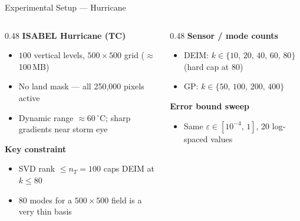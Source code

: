 \documentclass[aspectratio=169, 11pt]{beamer}
\begin{document}
\begin{frame}{Experimental Setup --- Hurricane}
\begin{columns}[T]

\begin{column}{0.48\textwidth}
  \textcolor{corange}{\textbf{ISABEL Hurricane (TC)}}\vspace{0.2em}
  \begin{itemize}\setlength\itemsep{0.3em}\small
    \item $100$ vertical levels, $500\times500$ grid ($\approx$100\,MB)
    \item No land mask --- all 250{,}000 pixels active
    \item Dynamic range $\approx 60\,^\circ$C; sharp gradients near storm eye
  \end{itemize}

  \vspace{0.6em}
  \textcolor{corange}{\textbf{Key constraint}}\vspace{0.2em}
  \begin{itemize}\setlength\itemsep{0.3em}\small
    \item SVD rank $\leq n_T = 100$ caps DEIM at $k \leq 80$
    \item 80 modes for a $500\times500$ field is a very thin basis
  \end{itemize}
\end{column}

\begin{column}{0.48\textwidth}
  \textcolor{corange}{\textbf{Sensor / mode counts}}\vspace{0.2em}
  \begin{itemize}\setlength\itemsep{0.3em}\small
    \item DEIM: $k \in \{10,\,20,\,40,\,60,\,80\}$ (hard cap at 80)
    \item GP: $k \in \{50,\,100,\,200,\,400\}$
  \end{itemize}

  \vspace{0.6em}
  \textcolor{corange}{\textbf{Error bound sweep}}\vspace{0.2em}
  \begin{itemize}\setlength\itemsep{0.3em}\small
    \item Same $\varepsilon \in [10^{-4},\,1]$, 20 log-spaced values
  \end{itemize}
\end{column}

\end{columns}
\end{frame}
\end{document}
